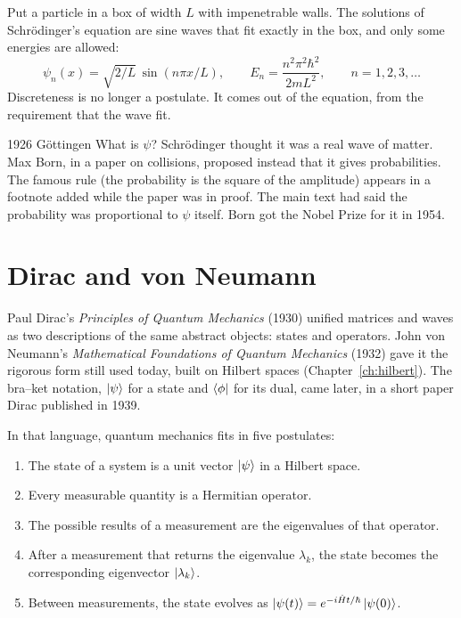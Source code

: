 Put a particle in a box of width $L$ with impenetrable walls. The solutions of
Schrödinger's equation are sine waves that fit exactly in the box, and only some
energies are allowed:
\[
  \psi_n(x) = \sqrt{2/L}\,\sin(n\pi x / L), \qquad
  E_n = \frac{n^2 \pi^2 \hbar^2}{2 m L^2}, \qquad n = 1, 2, 3, \dots
\]
Discreteness is no longer a postulate. It comes out of the equation, from the
requirement that the wave fit.

\begin{history}{1926 \textperiodcentered{} Göttingen}
What is $\psi$? Schrödinger thought it was a real wave of matter. Max Born, in a
paper on collisions, proposed instead that it gives probabilities. The famous
rule (the probability is the square of the amplitude) appears in a footnote
added while the paper was in proof. The main text had said the probability was
proportional to $\psi$ itself. Born got the Nobel Prize for it in 1954.
\end{history}

\section{Dirac and von Neumann}

Paul Dirac's \emph{Principles of Quantum Mechanics} (1930) unified matrices and
waves as two descriptions of the same abstract objects: states and operators.
John von Neumann's \emph{Mathematical Foundations of Quantum Mechanics} (1932)
gave it the rigorous form still used today, built on Hilbert spaces
(Chapter~\ref{ch:hilbert}). The bra--ket notation, $\ket{\psi}$ for a state and
$\bra{\phi}$ for its dual, came later, in a short paper Dirac published in 1939.

In that language, quantum mechanics fits in five postulates:

\begin{enumerate}
\item The state of a system is a unit vector $\ket{\psi}$ in a Hilbert space.
\item Every measurable quantity is a Hermitian operator.
\item The possible results of a measurement are the eigenvalues of that operator.
\item After a measurement that returns the eigenvalue $\lambda_k$, the state
becomes the corresponding eigenvector $\ket{\lambda_k}$.
\item Between measurements, the state evolves as
$\ket{\psi(t)} = e^{-i\hat H t/\hbar}\ket{\psi(0)}$.
\end{enumerate}

